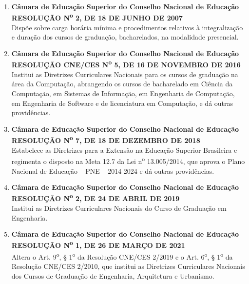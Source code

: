 \begin{enumerate}
    \item \textbf{Câmara de Educação Superior do Conselho Nacional de Educação}  \\
    \textbf{RESOLUÇÃO N\textsuperscript{o} 2, DE 18 DE JUNHO DE 2007}  \\
    Dispõe sobre carga horária mínima e procedimentos relativos à integralização e duração dos cursos de graduação, bacharelados, na modalidade presencial.
    
       \item \textbf{Câmara de Educação Superior do Conselho Nacional de Educação}  \\
    \textbf{RESOLUÇÃO CNE/CES N\textsuperscript{o} 5, DE 16 DE NOVEMBRO DE 2016}  \\
    Institui as Diretrizes Curriculares Nacionais para os cursos de graduação na área da Computação, abrangendo os cursos de bacharelado em Ciência da Computação, em Sistemas de Informação, em Engenharia de Computação, em Engenharia de Software e de licenciatura em Computação, e dá outras providências.

    \item \textbf{Câmara de Educação Superior do Conselho Nacional de Educação}  \\
    \textbf{RESOLUÇÃO N\textsuperscript{o} 7, DE 18 DE DEZEMBRO DE 2018}  \\
    Estabelece as Diretrizes para a Extensão na Educação Superior Brasileira e regimenta o disposto na Meta 12.7 da Lei n\textsuperscript{o} 13.005/2014, que aprova o Plano Nacional de Educação – PNE – 2014-2024 e dá outras providências.

    \item \textbf{Câmara de Educação Superior do Conselho Nacional de Educação}  \\
    \textbf{RESOLUÇÃO N\textsuperscript{o} 2, DE 24 DE ABRIL DE 2019}  \\
    Institui as Diretrizes Curriculares Nacionais do Curso de Graduação em Engenharia.

    \item \textbf{Câmara de Educação Superior do Conselho Nacional de Educação}  \\
    \textbf{RESOLUÇÃO N\textsuperscript{o} 1, DE 26 DE MARÇO DE 2021}  \\
    Altera o Art. 9\textsuperscript{o}, § 1\textsuperscript{o} da Resolução CNE/CES 2/2019 e o Art. 6\textsuperscript{o}, § 1\textsuperscript{o} da Resolução CNE/CES 2/2010, que institui as Diretrizes Curriculares Nacionais dos Cursos de Graduação de Engenharia, Arquitetura e Urbanismo.


\end{enumerate}
